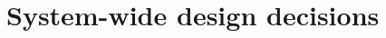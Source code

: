 \documentclass[Main]{subfiles}
\begin{document}
\setcounter{chapter}{2}
\chapter{System-wide design decisions}
\end{document}
